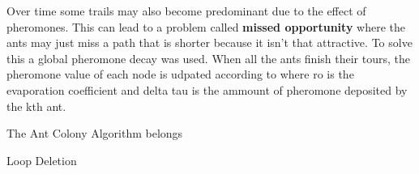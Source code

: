 \documentclass[times, 10pt,twocolumn]{article}
\begin{document}
Over time some trails may also become predominant due to the effect of pheromones. This can lead to a problem called \textbf{missed opportunity} where the ants may just miss a path that is shorter because it isn't that attractive. To solve this a global pheromone decay was used. When all the ants finish their tours, the pheromone value of each node is udpated according to 
where ro is the evaporation coefficient and delta tau is the ammount of pheromone deposited by the kth ant.



	The Ant Colony Algorithm belongs 
	



	Loop Deletion

\end{document}

